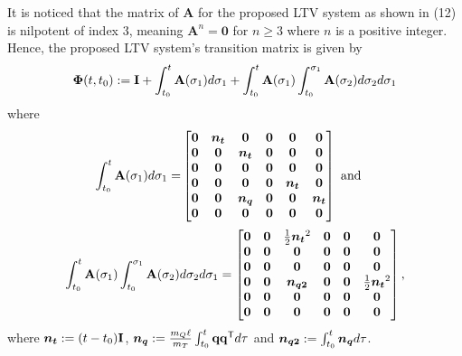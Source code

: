 \documentclass[journal,onecolumn]{IEEEtran}
\begin{document}
It is noticed that the matrix of ${\mathbf A}$ for the proposed LTV system as shown in (12) \cite{2024_Yang_TIE} is nilpotent of index 3, meaning ${\mathbf A}^n={\mathbf 0}$ for $n\geq3$ where $n$ is a positive integer.
Hence, the proposed LTV system's transition matrix is given by
%
	\begin{align}
	\boldsymbol{\Phi}(t,t_0):= {\mathbf I} + \int_{t_0}^t{\mathbf A}(\sigma_1)d\sigma_1 + \int_{t_0}^t{\mathbf A}(\sigma_1)\int_{t_0}^{\sigma_1}{\mathbf A}(\sigma_2)d\sigma_2d\sigma_1 
	\label{def:Phi_t_t0}
\end{align}
%
where
%
\begin{align}
	\int_{t_0}^t{\mathbf A}(\sigma_1)d\sigma_1= 
	&\begin{bmatrix}
			{\bf 0}  & \boldsymbol{n_{t}} & {\bf 0} & {\bf 0} & {\bf 0} & {\bf 0}\\
			{\bf 0}  & {\bf 0} & \boldsymbol{n_{t}}& {\bf 0} & {\bf 0} & {\bf 0}\\
			{\bf 0}  & {\bf 0} & {\bf 0} & {\bf 0} & {\bf 0} & {\bf 0}\\
			{\bf 0}  & {\bf 0} & {\bf 0} & {\bf 0} & \boldsymbol{n_{t}}& {\bf 0}\\
			{\bf 0}  & {\bf 0} & \boldsymbol{n_{q}} & {\bf 0} & {\bf 0} & \boldsymbol{n_{t}}\\
			{\bf 0}  & {\bf 0} & {\bf 0} & {\bf 0} & {\bf 0} & {\bf 0}
		\end{bmatrix}~\text{and}
\end{align}
%
\begin{align}
	\int_{t_0}^t{\mathbf A}(\sigma_1)\int_{t_0}^{\sigma_1}{\mathbf A}(\sigma_2)d\sigma_2d\sigma_1=
	\begin{bmatrix}
			{\bf 0}  & {\bf 0} & \frac{1}{2}\boldsymbol{n_{t}}^2 & {\bf 0} & {\bf 0} & {\bf 0}\\
			{\bf 0}  & {\bf 0} & {\bf 0} & {\bf 0} & {\bf 0} & {\bf 0}\\
			{\bf 0}  & {\bf 0} & {\bf 0} & {\bf 0} & {\bf 0} & {\bf 0}\\
			{\bf 0}  & {\bf 0} & \boldsymbol{n_{q2}} & {\bf 0} & {\bf 0} & \frac{1}{2}\boldsymbol{n_{t}}^2\\
			{\bf 0}  & {\bf 0} & {\bf 0} & {\bf 0} & {\bf 0} & {\bf 0}\\
			{\bf 0}  & {\bf 0} & {\bf 0} & {\bf 0} & {\bf 0} & {\bf 0}
		\end{bmatrix},
\end{align}
where $\boldsymbol{n_{t}}:=(t-t_0){\bf I}$,
  $\bs{n_{q}}:=\frac{\mQ\ell}{\mT}\int_{t_0}^t\dir\dir[T]d\tau$ and
$\boldsymbol{n_{q2}}:=\int_{t_0}^t\boldsymbol{n_{q}} d\tau$.
\end{document}
